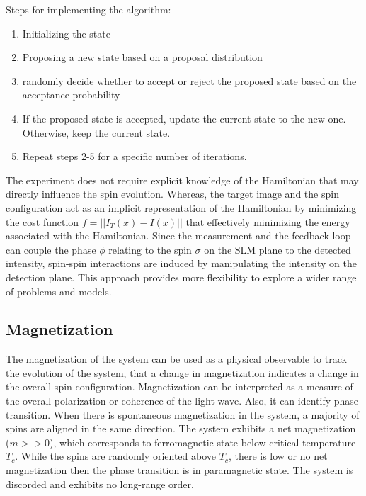 Steps for implementing the algorithm:\\
\begin{enumerate}
    \item Initializing the state
    \item Proposing a new state based on a proposal distribution
    \item randomly decide whether to accept or reject the proposed state based on the acceptance probability
    \item If the proposed state is accepted, update the current state to the new one. Otherwise, keep the current state.
    \item Repeat steps 2-5 for a specific number of iterations.
\end{enumerate}
    
The experiment does not require explicit knowledge of the Hamiltonian that may directly influence the spin evolution. Whereas, the target image and the spin configuration act as an implicit representation of the Hamiltonian by minimizing the cost function $f = ||I_T(x) - I(x)||$ that effectively minimizing the energy associated with the Hamiltonian. Since the measurement and the feedback loop can couple the phase $\phi$ relating to the spin $\sigma$ on the SLM plane to the detected intensity, spin-spin interactions are induced by manipulating the intensity on the detection plane. This approach provides more flexibility to explore a wider range of problems and models. \\

\subsection{Magnetization}
The magnetization of the system can be used as a physical observable to track the evolution of the system, that a change in magnetization indicates a change in the overall spin configuration. Magnetization can be interpreted as a measure of the overall polarization or coherence of the light wave. Also, it can identify phase transition. When there is spontaneous magnetization in the system, a majority of spins are aligned in the same direction. The system exhibits a net magnetization ($m>>0$), which corresponds to ferromagnetic state below critical temperature $T_c$.  While the spins are randomly oriented above $T_c$, there is low or no net magnetization then the phase transition is in paramagnetic state. The system is discorded and exhibits no long-range order.\\

